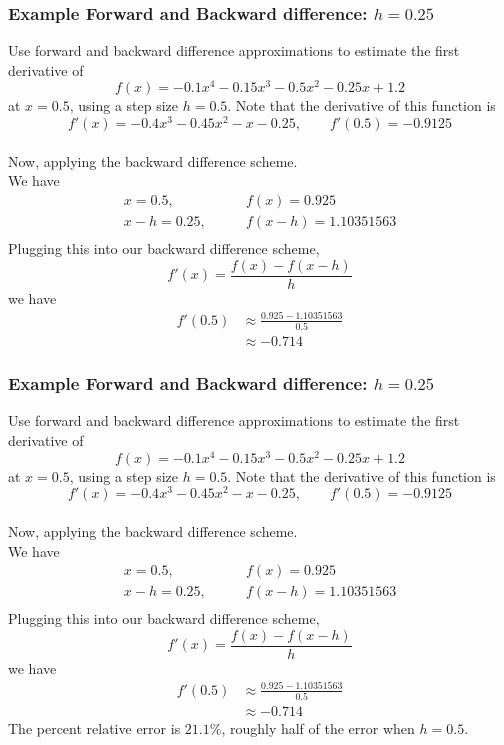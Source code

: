\documentclass{if-beamer}
\begin{document}
\begin{frame}
	\frametitle{Example Forward and Backward difference: $h= 0.25$}
	Use forward and backward difference approximations to estimate the first derivative of
	$$f(x) = -0.1x^4-0.15x^3-0.5x^2-0.25x+1.2 $$
	at $x=0.5$, using a step size $h = 0.5$. Note that the derivative of this function is
	$$f'(x) = -0.4x^3-0.45x^2-x-0.25, \qquad f'(0.5) = -0.9125$$
	\\\vspace{5pt}
	Now, applying the backward difference scheme.\\\vspace{5pt}
	We have
	\begin{align*}
		x = 0.5, \qquad &f(x) = 0.925\\
		x-h = 0.25, \qquad &f(x-h) = 1.10351563\\
	\end{align*}
	Plugging this into our backward difference scheme, 
	$$f'(x) = \frac{f(x)-f(x-h)}{h} $$
	we have
	\begin{align*}
		f'(0.5) &\approx \frac{0.925-1.10351563}{0.5} \\
		&\approx -0.714
	\end{align*}
\end{frame}


\begin{frame}
	\frametitle{Example Forward and Backward difference: $h= 0.25$}
	Use forward and backward difference approximations to estimate the first derivative of
	$$f(x) = -0.1x^4-0.15x^3-0.5x^2-0.25x+1.2 $$
	at $x=0.5$, using a step size $h = 0.5$. Note that the derivative of this function is
	$$f'(x) = -0.4x^3-0.45x^2-x-0.25, \qquad f'(0.5) = -0.9125$$
	\\\vspace{5pt}
	Now, applying the backward difference scheme.\\\vspace{5pt}
	We have
	\begin{align*}
		x = 0.5, \qquad &f(x) = 0.925\\
		x-h = 0.25, \qquad &f(x-h) = 1.10351563\\
	\end{align*}
	Plugging this into our backward difference scheme, 
	$$f'(x) = \frac{f(x)-f(x-h)}{h} $$
	we have
	\begin{align*}
		f'(0.5) &\approx \frac{0.925-1.10351563}{0.5} \\
		&\approx -0.714
	\end{align*}
	The percent relative error is $21.1\%$, roughly half of the error when $h=0.5$.
\end{frame}
\end{document}
